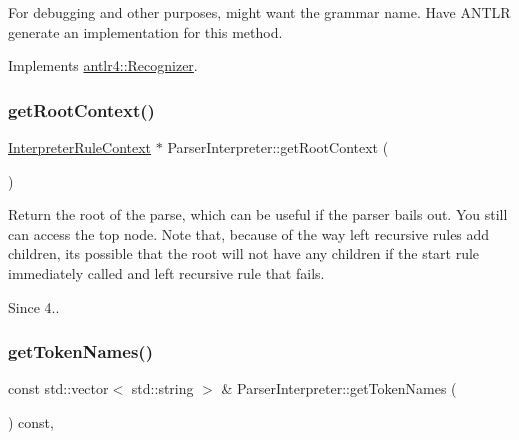 For debugging and other purposes, might want the grammar name. Have A\+N\+T\+LR generate an implementation for this method. 



Implements \hyperlink{classantlr4_1_1Recognizer_a41d77f1ad38c68b4208d26c070fd2cc7}{antlr4\+::\+Recognizer}.

\mbox{\label{classantlr4_1_1ParserInterpreter_a451ec3d6780fe95f9396ffbe582edec2}} 
\subsubsection{\texorpdfstring{get\+Root\+Context()}{getRootContext()}}
{\footnotesize\ttfamily \hyperlink{classantlr4_1_1InterpreterRuleContext}{Interpreter\+Rule\+Context} $\ast$ Parser\+Interpreter\+::get\+Root\+Context (\begin{DoxyParamCaption}{ }\end{DoxyParamCaption})}

Return the root of the parse, which can be useful if the parser bails out. You still can access the top node. Note that, because of the way left recursive rules add children, it\textquotesingle{}s possible that the root will not have any children if the start rule immediately called and left recursive rule that fails.

\begin{DoxySince}{Since}
4.. 
\end{DoxySince}
\mbox{\label{classantlr4_1_1ParserInterpreter_a8aaa489bc12ef24e3808ecfc41609869}} 
\subsubsection{\texorpdfstring{get\+Token\+Names()}{getTokenNames()}}
{\footnotesize\ttfamily const std\+::vector$<$ std\+::string $>$ \& Parser\+Interpreter\+::get\+Token\+Names (\begin{DoxyParamCaption}{ }\end{DoxyParamCaption}) const\hspace{0.3cm}{\ttfamily [override]}, {\ttfamily [virtual]}}


